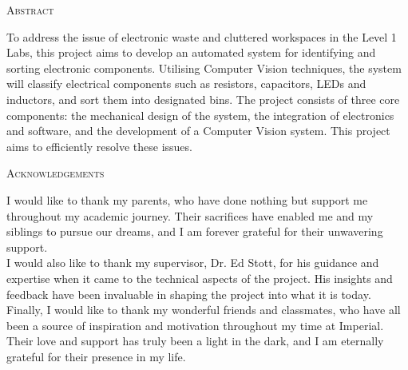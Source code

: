\documentclass[12pt, a4paper]{article}
\let\oldsection\section
\renewcommand\section[1]{
  \pagebreak\
  \oldsection{#1}
  {\hypersetup{hidelinks}\secttoc\thispagestyle{fancy}}
}
\begin{document}
\newpage
\vspace*{\fill}
\begin{center}
  \large\textsc{Abstract} \\
\end{center}
\noindent To address the issue of electronic waste and cluttered workspaces in the Level 1 Labs, this project aims to develop an automated system for identifying and sorting electronic components. Utilising Computer Vision techniques, the system will classify electrical components such as resistors, capacitors, LEDs and inductors, and sort them into designated bins. The project consists of three core components: the mechanical design of the system, the integration of electronics and software, and the development of a Computer Vision system. This project aims to efficiently resolve these issues. \\
\vspace*{\fill}

\newpage
\vspace*{\fill}
\begin{center}
  \large\textsc{Acknowledgements} \\
\end{center}
\noindent I would like to thank my parents, who have done nothing but support me throughout my academic journey. Their sacrifices have enabled me and my siblings to pursue our dreams, and I am forever grateful for their unwavering support. \\
I would also like to thank my supervisor, Dr. Ed Stott, for his guidance and expertise when it came to the technical aspects of the project. His insights and feedback have been invaluable in shaping the project into what it is today. \\
Finally, I would like to thank my wonderful friends and classmates, who have all been a source of inspiration and motivation throughout my time at Imperial. Their love and support has truly been a light in the dark, and I am eternally grateful for their presence in my life. \\
\vspace*{\fill}
\newpage

{\hypersetup{hidelinks}\tableofcontents\thispagestyle{fancy}}
\newcommand{\neutralizelistoftodos}{
  \begingroup
  \renewcommand{\section}[1]{}
  \newpage
  {\large\textbf{List of Todos}}
  \listoftodos
  \endgroup
}
\end{document}
